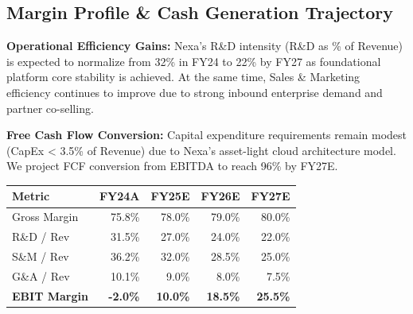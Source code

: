 \documentclass[10pt,a4paper]{scrartcl}
\begin{document}
\vspace{10pt}

\textcolor{NavyPrimary}{\subsection*{Margin Profile \& Cash Generation Trajectory}}

\begin{minipage}[t]{0.48\textwidth}
    \vspace{0pt}
    \small
    \textbf{Operational Efficiency Gains:}
    Nexa's R\&D intensity (R\&D as \% of Revenue) is expected to normalize from 32\% in FY24 to 22\% by FY27 as foundational platform core stability is achieved. At the same time, Sales \& Marketing efficiency continues to improve due to strong inbound enterprise demand and partner co-selling.
    
    \vspace{6pt}
    \textbf{Free Cash Flow Conversion:}
    Capital expenditure requirements remain modest (CapEx < 3.5\% of Revenue) due to Nexa's asset-light cloud architecture model. We project FCF conversion from EBITDA to reach 96\% by FY27E.
\end{minipage}%
\hfill
\begin{minipage}[t]{0.48\textwidth}
    \vspace{0pt}
    \begin{tcolorbox}[calloutbox, title=\textcolor{NavyPrimary}{Operating Margin Progression (\% of Rev)}, colframe=BorderGray, colbacktitle=LightBlueBg, coltitle=NavyPrimary]
        \small
        \setlength{\tabcolsep}{3pt}
        \begin{tabularx}{\textwidth}{@{} L r r r r @{}}
            \toprule
            \textbf{Metric} & \textbf{FY24A} & \textbf{FY25E} & \textbf{FY26E} & \textbf{FY27E} \\
            \midrule
            Gross Margin & 75.8\% & 78.0\% & 79.0\% & 80.0\% \\
            R\&D / Rev & 31.5\% & 27.0\% & 24.0\% & 22.0\% \\
            S\&M / Rev & 36.2\% & 32.0\% & 28.5\% & 25.0\% \\
            G\&A / Rev & 10.1\% & 9.0\% & 8.0\% & 7.5\% \\
            \midrule
            \textbf{EBIT Margin} & \textbf{-2.0\%} & \textbf{10.0\%} & \textbf{18.5\%} & \textbf{25.5\%} \\
            \bottomrule
        \end{tabularx}
    \end{tcolorbox}
\end{minipage}
\end{document}
